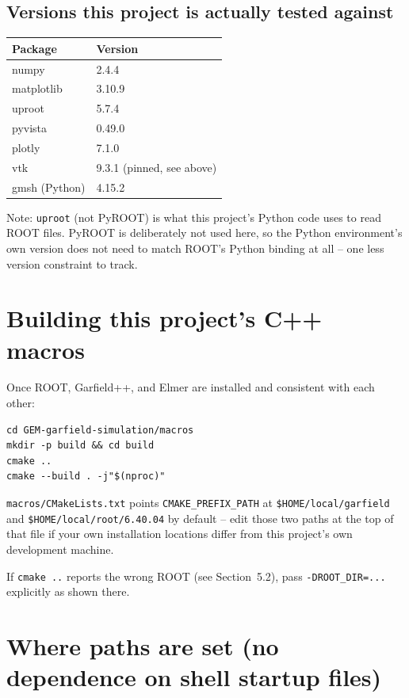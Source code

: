 \documentclass[11pt]{article}
\begin{document}
\subsection{Versions this project is actually tested against}

\begin{table}[h]
\centering
\begin{tabular}{@{}ll@{}}
\toprule
Package & Version \\
\midrule
numpy & 2.4.4 \\
matplotlib & 3.10.9 \\
uproot & 5.7.4 \\
pyvista & 0.49.0 \\
plotly & 7.1.0 \\
vtk & 9.3.1 (pinned, see above) \\
gmsh (Python) & 4.15.2 \\
\bottomrule
\end{tabular}
\end{table}

Note: \texttt{uproot} (not PyROOT) is what this project's Python code
uses to read ROOT files. PyROOT is deliberately not used here, so the
Python environment's own version does not need to match ROOT's Python
binding at all -- one less version constraint to track.

\section{Building this project's C++ macros}

Once ROOT, Garfield++, and Elmer are installed and consistent with each
other:

\begin{lstlisting}
cd GEM-garfield-simulation/macros
mkdir -p build && cd build
cmake ..
cmake --build . -j"$(nproc)"
\end{lstlisting}

\texttt{macros/CMakeLists.txt} points \texttt{CMAKE\_PREFIX\_PATH} at
\texttt{\$HOME/local/garfield} and \texttt{\$HOME/local/root/6.40.04} by
default -- edit those two paths at the top of that file if your own
installation locations differ from this project's own development
machine.

If \texttt{cmake ..} reports the wrong ROOT (see
Section~5.2), pass \texttt{-DROOT\_DIR=...} explicitly as shown there.

\section{Where paths are set (no dependence on shell startup files)}
\label{sec:paths}
\end{document}

